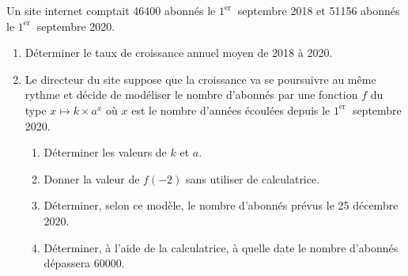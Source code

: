 \documentclass[french]{book}
\begin{document}
\begin{exocor}
Un site internet comptait 46400 abonnés le $1^{\text {er }}$ septembre 2018 et 51156 abonnés le $1^{\text {er }}$ septembre 2020.

\begin{enumerate}
\item Déterminer le taux de croissance annuel moyen de 2018 à 2020.

\item Le directeur du site suppose que la croissance va se poursuivre au même rythme et décide de modéliser le nombre d'abonnés par une fonction $f$ du type $x \mapsto k \times a^{x}$ où $x$ est le nombre d'années écoulées depuis le $1^{\text {er }}$ septembre 2020.

\begin{enumerate}
\item Déterminer les valeurs de $k$ et $a$.

\item Donner la valeur de $f(-2)$ sans utiliser de calculatrice.

\item Déterminer, selon ce modèle, le nombre d'abonnés prévus le 25 décembre 2020.

\item Déterminer, à l'aide de la calculatrice, à quelle date le nombre d'abonnés dépassera 60000. 
\end{enumerate}
\end{enumerate}
\end{exocor}
\end{document}
